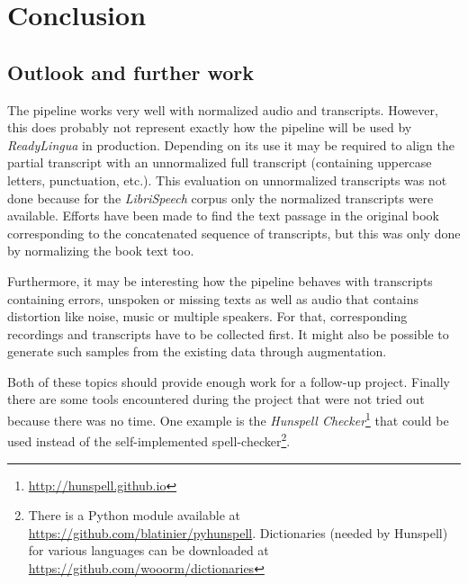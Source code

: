 \section{Conclusion}\label{conclusion}



\subsection{Outlook and further work}

The pipeline works very well with normalized audio and transcripts. However, this does probably not represent exactly how the pipeline will be used by \textit{ReadyLingua} in production. Depending on its use it may be required to align the partial transcript with an unnormalized full transcript (containing uppercase letters, punctuation, etc.). This evaluation on unnormalized transcripts was not done because for the \textit{LibriSpeech} corpus only the normalized transcripts were available. Efforts have been made to find the text passage in the original book corresponding to the concatenated sequence of transcripts, but this was only done by normalizing the book text too.

Furthermore, it may be interesting how the pipeline behaves with transcripts containing errors, unspoken or missing texts as well as audio that contains distortion like noise, music or multiple speakers. For that, corresponding recordings and transcripts have to be collected first. It might also be possible to generate such samples from the existing data through augmentation.

Both of these topics should provide enough work for a follow-up project. Finally there are some tools encountered during the project that were not tried out because there was no time. One example is the \textit{Hunspell Checker}\footnote{\url{http://hunspell.github.io}} that could be used instead of the self-implemented spell-checker\footnote{There is a Python module available at \url{https://github.com/blatinier/pyhunspell}. Dictionaries (needed by Hunspell) for various languages can be downloaded at \url{https://github.com/wooorm/dictionaries}}.